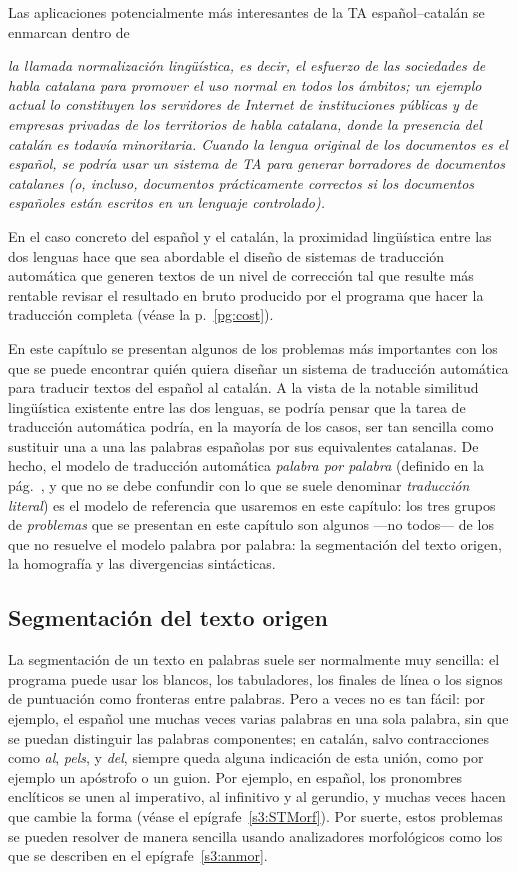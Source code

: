 Las aplicaciones potencialmente más interesantes de la TA español--catalán se enmarcan dentro de {\em la llamada {\em normalización lingüística}, es decir, el esfuerzo de las sociedades de habla catalana para promover el uso normal en todos los ámbitos; un ejemplo actual lo constituyen los servidores de Internet de instituciones públicas y de empresas privadas de los territorios de habla catalana, donde la presencia del catalán es todavía minoritaria. Cuando la lengua original de los documentos es el español, se podría usar un sistema de TA para generar borradores de documentos catalanes (o, incluso, documentos prácticamente correctos si los documentos españoles están escritos en un lenguaje controlado). 

En el caso concreto del español y el catalán, la proximidad lingüística entre las dos lenguas hace que sea abordable el diseño de sistemas de traducción automática que generen textos de un nivel de corrección tal que resulte más rentable revisar el resultado en bruto producido por el programa que hacer la traducción completa (véase la p.~\ref{pg:cost}). 

En este capítulo se presentan algunos de los problemas más importantes con los que se puede encontrar quién quiera diseñar un sistema de traducción automática para traducir textos del español al catalán. A la vista de la notable similitud lingüística existente entre las dos lenguas, se podría pensar que la tarea de traducción automática podría, en la mayoría de los casos, ser tan sencilla como sustituir una a una las palabras españolas por sus equivalentes catalanas. De hecho, el modelo de traducción automática \emph{palabra por palabra} (definido en la pág.~\pageref{pg:mpm}, y que no se debe confundir con lo que se suele denominar \emph{traducción literal}) es el modelo de referencia que usaremos en este capítulo: los tres grupos de {\em problemas} que se presentan en este capítulo son algunos ---no todos--- de los que no resuelve el modelo palabra por palabra: la segmentación del texto origen, la homografía y las divergencias sintácticas. 

\subsection{Segmentación del texto origen} 

La segmentación de un texto en palabras suele ser normalmente muy sencilla: el programa puede usar los blancos, los tabuladores, los finales de línea o los signos de puntuación como fronteras entre palabras. Pero a veces no es tan fácil: por ejemplo, el español une muchas veces varias palabras en una sola palabra, sin que se  puedan distinguir las palabras componentes; en catalán, salvo contracciones como \emph{al}, \emph{pels}, y \emph{del}, siempre queda alguna indicación de esta unión, como por ejemplo un apóstrofo o un guion. Por ejemplo, en español, los pronombres enclíticos se unen al imperativo, al infinitivo y al gerundio, y muchas veces hacen que  cambie la forma (véase el epígrafe~\ref{s3:STMorf}). Por suerte, estos problemas se pueden resolver de manera sencilla usando analizadores morfológicos como los que se describen en el epígrafe~\ref{s3:anmor}. 

}
